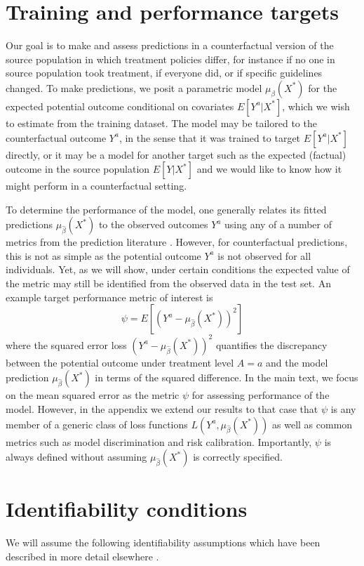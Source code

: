 \section{Training and performance targets} \label{sec:targets}
Our goal is to make and assess predictions in a counterfactual version of the source population in which treatment policies differ, for instance if no one in source population took treatment, if everyone did, or if specific guidelines changed. To make predictions, we posit a parametric model $\mu_{\beta}(X^*)$ for the expected potential outcome conditional on covariates $E[Y^a | X^*]$, which we wish to estimate from the training dataset. The model may be tailored to the counterfactual outcome $Y^a$, in the sense that it was trained to target $E[Y^a | X^*]$ directly, or it may be a model for another target such as the  expected (factual) outcome in the source population $E[Y | X^*]$ and we would like to know how it might perform in a counterfactual setting.

To determine the performance of the model, one generally relates its fitted predictions $\mu_{\widehat{\beta}}(X^*)$ to the observed outcomes $Y^a$ using any of a number of metrics from the prediction literature \cite{harrell_multivariable_1996,steyerberg_clinical_2019,altman_what_2000}. However, for counterfactual predictions, this is not as simple as the potential outcome $Y^a$ is not observed for all individuals. Yet, as we will show, under certain conditions the expected value of the metric may still be identified from the observed data in the test set. An example target performance metric of interest is 
\begin{equation*}
    \psi = E[(Y^a - \mu_{\widehat{\beta}}(X^*))^2]
\end{equation*}
where the squared error loss $(Y^a - \mu_{\widehat{\beta}}(X^*))^2$ quantifies the discrepancy between the potential outcome under treatment level $A = a$ and the model prediction $\mu_{\widehat{\beta}}(X^*)$ in terms of the squared difference. In the main text, we focus on the mean squared error as the metric $\psi$ for assessing performance of the model. However, in the appendix we extend our results to that case that $\psi$ is any member of a generic class of loss functions $L(Y^a,  \mu_{\widehat{\beta}}(X^*))$ as well as common metrics such as model discrimination and risk calibration. Importantly, $\psi$ is always defined without assuming $\mu_{\widehat{\beta}}(X^*)$ is correctly specified.

\section{Identifiability conditions} \label{sec:identifiability}
We will assume the following identifiability assumptions which have been described in more detail elsewhere \cite{hernan_causal_2020,robins_new_1986,robins_graphical_1987}.

